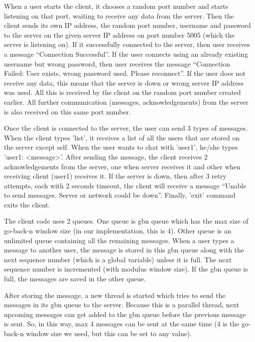 \documentclass[10pt, pdftex, twocolumn]{report}
\begin{document}
	When a user starts the client, it chooses a random port number and starts listening on that port, waiting to receive any data from the server. Then the client sends its own IP address, the random port number, username and password to the server on the given server IP address on port number 5005 (which the server is listening on). If it successfully connected to the server, then user receives a message “Connection Successful”. If the user connects using an already existing username but wrong password, then user receives the message “Connection Failed: User exists, wrong password used. Please reconnect”. If the user does not receive any data, this means that the server is down or wrong server IP address was used. All this is received by the client on the random port number created earlier. All further communication (messages, acknowledgements) from the server is also received on this same port number.
	
	Once the client is connected to the server, the user can send 3 types of messages. When the client types 'list', it receives a list of all the users that are stored on the server except self. When the user wants to chat with 'user1', he/she types 'user1: <message>'. After sending the message, the client receives 2 acknowledgements from the server, one when server receives it and other when receiving client (user1) receives it. If the server is down, then after 3 retry attempts, each with 2 seconds timeout, the client will receive a message “Unable to send messages. Server or network could be down”. Finally, 'exit' command exits the client.
	
	The client code uses 2 queues. One queue is gbn queue which has the max size of go-back-n window size (in our implementation, this is 4). Other queue is an unlimited queue containing all the remaining messages. When a user types a message to another user, the message is stored in this gbn queue along with the next sequence number (which is a global variable) unless it is full. The next sequence number is incremented (with modulus window size). If the gbn queue is full, the messages are saved in the other queue.
	
	After storing the message, a new thread is started which tries to send the messages in its gbn queue to the server. Because this is a parallel thread, next upcoming messages can get added to the gbn queue before the previous message is sent. So, in this way, max 4 messages can be sent at the same time (4 is the go-back-n window size we used, but this can be set to any value). 
	
\end{document}
